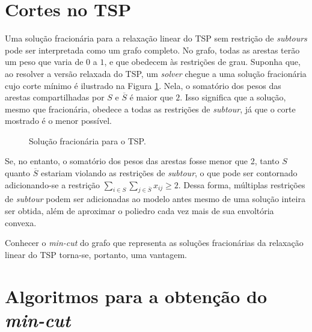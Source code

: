 \section{Cortes no TSP}
Uma solução fracionária para a relaxação linear do TSP sem restrição de \textit{subtours} pode ser interpretada como um grafo completo. No grafo, todas as arestas terão um peso que varia de \(0\) a \(1\), e que obedecem às restrições de grau.
Suponha que, ao resolver a versão relaxada do TSP,  um \textit{solver} chegue a uma solução fracionária cujo corte mínimo é ilustrado na Figura \ref{fig:solucaoFrac}. Nela, o somatório dos pesos das arestas compartilhadas por \(S\) e \(\overline{S}\) é maior que \(2\). Isso significa que a solução, mesmo que fracionária, obedece a todas as restrições de \textit{subtour}, já que o corte mostrado é o menor possível. 

\begin{figure}[h]
    \caption{Solução fracionária para o TSP.}
    \label{fig:solucaoFrac}
\end{figure}

Se, no entanto, o somatório dos pesos das arestas fosse menor que 2, tanto \(S\) quanto \(\overline{S}\) estariam violando as restrições de \textit{subtour}, o que pode ser contornado adicionando-se a restrição \(\sum_{i \in S}\sum_{j \in \overline{S}}x_{ij} \geq 2\). Dessa forma, múltiplas restrições de \textit{subtour} podem ser adicionadas ao modelo antes mesmo de uma solução inteira ser obtida, além de aproximar o poliedro cada vez mais de sua envoltória convexa.

Conhecer o \textit{min-cut} do grafo que representa as soluções fracionárias da relaxação linear do TSP torna-se, portanto, uma vantagem.

\section{Algoritmos para a obtenção do \textit{min-cut}}

